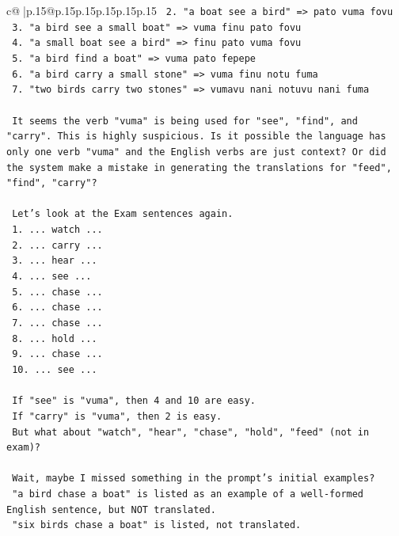 \documentclass{article}
\begin{document}
{\begin{supertabular}{c@{$\;$}|p{.15\linewidth}@{}p{.15\linewidth}p{.15\linewidth}p{.15\linewidth}p{.15\linewidth}p{.15\linewidth}}
{{{\texttt{  2. "a boat see a bird" => pato vuma fovu} \\
\texttt{  3. "a bird see a small boat" => vuma finu pato fovu} \\
\texttt{  4. "a small boat see a bird" => finu pato vuma fovu} \\
\texttt{  5. "a bird find a boat" => vuma pato fepepe} \\
\texttt{  6. "a bird carry a small stone" => vuma finu notu fuma} \\
\texttt{  7. "two birds carry two stones" => vumavu nani notuvu nani fuma} \\
\\ 
\texttt{  It seems the verb "vuma" is being used for "see", "find", and "carry". This is highly suspicious. Is it possible the language has only one verb "vuma" and the English verbs are just context? Or did the system make a mistake in generating the translations for "feed", "find", "carry"?} \\
\\ 
\texttt{  Let's look at the Exam sentences again.} \\
\texttt{  1. ... watch ...} \\
\texttt{  2. ... carry ...} \\
\texttt{  3. ... hear ...} \\
\texttt{  4. ... see ...} \\
\texttt{  5. ... chase ...} \\
\texttt{  6. ... chase ...} \\
\texttt{  7. ... chase ...} \\
\texttt{  8. ... hold ...} \\
\texttt{  9. ... chase ...} \\
\texttt{  10. ... see ...} \\
\\ 
\texttt{  If "see" is "vuma", then 4 and 10 are easy.} \\
\texttt{  If "carry" is "vuma", then 2 is easy.} \\
\texttt{  But what about "watch", "hear", "chase", "hold", "feed" (not in exam)?} \\
\\ 
\texttt{  Wait, maybe I missed something in the prompt's initial examples?} \\
\texttt{  "a bird chase a boat" is listed as an example of a well{-}formed English sentence, but NOT translated.} \\
\texttt{  "six birds chase a boat" is listed, not translated.} \\
}}}
\end{supertabular}}
\end{document}
